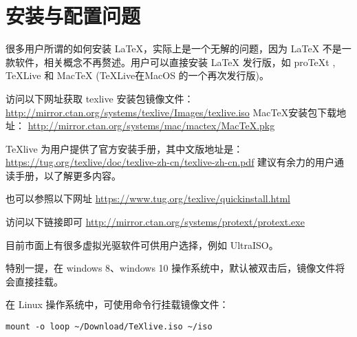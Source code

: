 %
%
%
%

\section{安装与配置问题}
\label{sec:install}



很多用户所谓的如何安装 LaTeX，实际上是一个无解的问题，因为 LaTeX
不是一款软件，相关概念不再赘述。用户可以直接安装 LaTeX 发行版，如
proTeXt , TeXLive 和 MacTeX (TeXLive在MacOS 的一个再次发行版)。



访问以下网址获取 texlive 安装包镜像文件：
\url{http://mirror.ctan.org/systems/texlive/Images/texlive.iso}
MacTeX安装包下载地址：
\url{http://mirror.ctan.org/systems/mac/mactex/MacTeX.pkg}



TeXlive 为用户提供了官方安装手册，其中文版地址是：
\url{https://tug.org/texlive/doc/texlive-zh-cn/texlive-zh-cn.pdf}
建议有余力的用户通读手册，以了解更多内容。

也可以参照以下网址 \url{https://www.tug.org/texlive/quickinstall.html}



访问以下链接即可 \url{http://mirror.ctan.org/systems/protext/protext.exe}



目前市面上有很多虚拟光驱软件可供用户选择，例如 UltraISO。

特别一提，在 windows 8、windows 10
操作系统中，默认被双击后，镜像文件将会直接挂载。

在 Linux 操作系统中，可使用命令行挂载镜像文件：
\begin{verbatim}
mount -o loop ~/Download/TeXlive.iso ~/iso
\end{verbatim}


